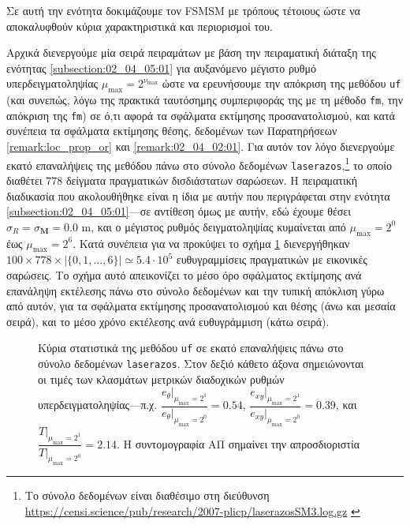 Σε αυτή την ενότητα δοκιμάζουμε τον FSMSM με τρόπους τέτοιους ώστε να
αποκαλυφθούν κύρια χαρακτηριστικά και περιορισμοί του.

Αρχικά διενεργούμε μία σειρά πειραμάτων με βάση την πειραματική διάταξη της
ενότητας \ref{subsection:02_04_05:01} για αυξανόμενο μέγιστο ρυθμό
υπερδειγματοληψίας $\mu_{\max} = 2^{\nu_{\max}}$ ώστε να ερευνήσουμε την
απόκριση της μεθόδου \texttt{uf} (και συνεπώς, λόγω της πρακτικά ταυτόσημης
συμπεριφοράς της με τη μέθοδο \texttt{fm}, την απόκριση της \texttt{fm}) σε
ό,τι αφορά τα σφάλματα εκτίμησης προσανατολισμού, και κατά συνέπεια τα σφάλματα
εκτίμησης θέσης, δεδομένων των Παρατηρήσεων \ref{remark:loc_prop_or} και
\ref{remark:02_04_02:01}. Για αυτόν τον λόγο διενεργούμε εκατό επαναλήψεις της
μεθόδου πάνω στο σύνολο δεδομένων \texttt{laserazos},\footnote{Το σύνολο
δεδομένων είναι διαθέσιμο στη διεύθυνση
\url{https://censi.science/pub/research/2007-plicp/laserazosSM3.log.gz}
\label{foot:laserazos}} το οποίο διαθέτει $778$ δείγματα πραγματικών
δισδιάστατων σαρώσεων. Η πειραματική διαδικασία που ακολουθήθηκε είναι η ίδια
με αυτήν που περιγράφεται στην ενότητα \ref{subsection:02_04_05:01}---σε
αντίθεση όμως με αυτήν, εδώ έχουμε θέσει $\sigma_R = \sigma_{\bm{M}} = 0.0$ m,
και ο μέγιστος ρυθμός δειγματοληψίας κυμαίνεται από $\mu_{\max} = 2^0$ έως
$\mu_{\max} = 2^6$. Κατά συνέπεια για να προκύψει το σχήμα
\ref{fig:02_04_06:01} διενεργήθηκαν $100 \times 778 \times |\{0,1,\dots,6\}|
\simeq 5.4\cdot 10^5$ ευθυγραμμίσεις πραγματικών με εικονικές σαρώσεις. Το
σχήμα αυτό απεικονίζει το μέσο όρο σφάλματος εκτίμησης ανά επανάληψη εκτέλεσης
πάνω στο σύνολο δεδομένων και την τυπική απόκλιση γύρω από αυτόν, για τα
σφάλματα εκτίμησης προσανατολισμού και θέσης (άνω και μεσαία σειρά), και το
μέσο χρόνο εκτέλεσης ανά ευθυγράμμιση (κάτω σειρά).

\begin{figure}\centering
  
  \caption{\small Κύρια στατιστικά της μεθόδου \texttt{uf} σε εκατό επαναλήψεις
           πάνω στο σύνολο δεδομένων \texttt{laserazos}. Στον δεξιό κάθετο άξονα
           σημειώνονται οι τιμές των κλασμάτων μετρικών διαδοχικών ρυθμών
           υπερδειγματοληψίας---π.χ.
           $\dfrac{e_{\theta}|_{\mu_{\max} = 2^1}}{e_{\theta}|_{\mu_{\max} = 2^0}} = 0.54$,
           $\dfrac{e_{xy}|_{\mu_{\max} = 2^1}}{e_{xy}|_{\mu_{\max} = 2^0}} = 0.39$,
           και $\dfrac{T|_{\mu_{\max} = 2^1}}{T|_{\mu_{\max} = 2^0}} = 2.14$. Η
           συντομογραφία ΑΠ σημαίνει την απροσδιοριστία}
  \label{fig:02_04_06:01}
\end{figure}

